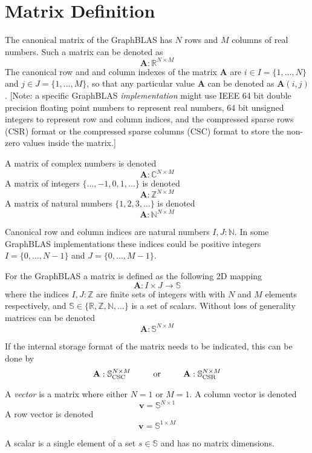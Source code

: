 \section{Matrix Definition}
  The canonical matrix of the GraphBLAS has $N$ rows and $M$ columns of real numbers.  Such a matrix can be denoted as
$$
  \mathbf{A}: \mathbb{R}^{N \times M}
$$
The canonical row and and column indexes of the matrix $\mathbf{A}$ are $i \in I = \{1,\ldots,N\}$ and $j \in J = \{1,\ldots,M\}$, so that any particular value $\mathbf{A}$ can be denoted as $\mathbf{A}(i,j)$.  [Note: a specific GraphBLAS \emph{implementation} might use IEEE 64 bit double precision floating point numbers to represent real numbers, 64 bit unsigned integers to represent row and column indices, and the compressed sparse rows (CSR) format or the compressed sparse columns (CSC) format to store the non-zero values inside the matrix.]

  A matrix of complex numbers is denoted
$$
  \mathbf{A}: \mathbb{C}^{N \times M}
$$
  A matrix of integers $\{\ldots, -1, 0, 1, \ldots\}$ is denoted
$$
  \mathbf{A}: \mathbb{Z}^{N \times M}
$$
  A matrix of natural numbers $\{1, 2, 3, \ldots\}$ is denoted
$$
  \mathbf{A}: \mathbb{N}^{N \times M}
$$

  Canonical row and column indices are natural numbers $I,J : \mathbb{N}$.  In some GraphBLAS implementations these indices could be positive integers  $I = \{0,\ldots,N-1\}$ and $J = \{0,\ldots,M-1\}$.
  
  For the GraphBLAS a matrix is defined as the following 2D mapping
$$
  \mathbf{A} : I \times J \rightarrow \mathbb{S}
$$
where the indices $I, J : \mathbb{Z}$ are finite sets of integers with with $N$ and $M$ elements respectively, and  $\mathbb{S} \in \{\mathbb{R},\mathbb{Z},\mathbb{N}, \ldots \}$ is a set of scalars.  Without loss of generality matrices can be denoted
$$
  \mathbf{A}: \mathbb{S}^{N \times M}
$$

If the internal storage format of the matrix needs to be indicated, this can be done by
$$
  \mathbf{A}: \mathbb{S}^{N \times M}_{\rm CSC}  ~~~~~~~~ {\rm or}  ~~~~~~~~ 
  \mathbf{A}: \mathbb{S}^{N \times M}_{\rm CSR}
$$

  A \emph{vector} is a matrix where either $N=1$ or $M=1$. A column vector is denoted
$$
 \mathbf{v} = \mathbb{S}^{N \times 1}
$$
  A row vector is denoted
$$
  \mathbf{v} = \mathbb{S}^{1 \times M}
$$

  A scalar is a single element of a set $s \in \mathbb{S}$ and has no matrix dimensions.

